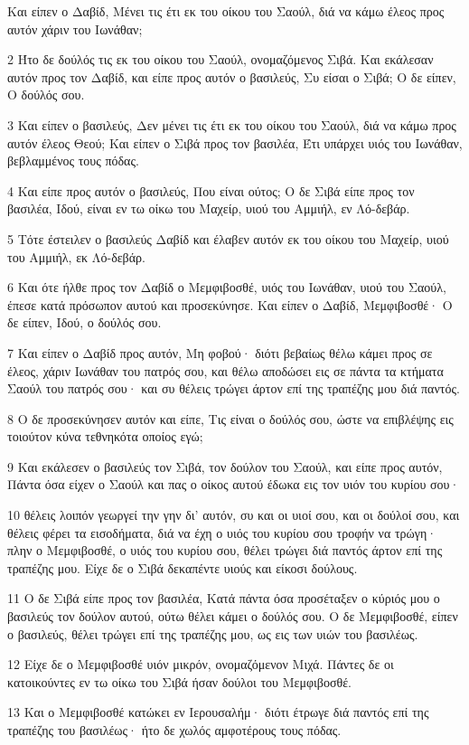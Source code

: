 \par Και είπεν ο Δαβίδ, Μένει τις έτι εκ του οίκου του Σαούλ, διά να κάμω έλεος προς αυτόν χάριν του Ιωνάθαν;
\par 2 Ήτο δε δούλός τις εκ του οίκου του Σαούλ, ονομαζόμενος Σιβά. Και εκάλεσαν αυτόν προς τον Δαβίδ, και είπε προς αυτόν ο βασιλεύς, Συ είσαι ο Σιβά; Ο δε είπεν, Ο δούλός σου.
\par 3 Και είπεν ο βασιλεύς, Δεν μένει τις έτι εκ του οίκου του Σαούλ, διά να κάμω προς αυτόν έλεος Θεού; Και είπεν ο Σιβά προς τον βασιλέα, Έτι υπάρχει υιός του Ιωνάθαν, βεβλαμμένος τους πόδας.
\par 4 Και είπε προς αυτόν ο βασιλεύς, Που είναι ούτος; Ο δε Σιβά είπε προς τον βασιλέα, Ιδού, είναι εν τω οίκω του Μαχείρ, υιού του Αμμιήλ, εν Λό-δεβάρ.
\par 5 Τότε έστειλεν ο βασιλεύς Δαβίδ και έλαβεν αυτόν εκ του οίκου του Μαχείρ, υιού του Αμμιήλ, εκ Λό-δεβάρ.
\par 6 Και ότε ήλθε προς τον Δαβίδ ο Μεμφιβοσθέ, υιός του Ιωνάθαν, υιού του Σαούλ, έπεσε κατά πρόσωπον αυτού και προσεκύνησε. Και είπεν ο Δαβίδ, Μεμφιβοσθέ· Ο δε είπεν, Ιδού, ο δούλός σου.
\par 7 Και είπεν ο Δαβίδ προς αυτόν, Μη φοβού· διότι βεβαίως θέλω κάμει προς σε έλεος, χάριν Ιωνάθαν του πατρός σου, και θέλω αποδώσει εις σε πάντα τα κτήματα Σαούλ του πατρός σου· και συ θέλεις τρώγει άρτον επί της τραπέζης μου διά παντός.
\par 8 Ο δε προσεκύνησεν αυτόν και είπε, Τις είναι ο δούλός σου, ώστε να επιβλέψης εις τοιούτον κύνα τεθνηκότα οποίος εγώ;
\par 9 Και εκάλεσεν ο βασιλεύς τον Σιβά, τον δούλον του Σαούλ, και είπε προς αυτόν, Πάντα όσα είχεν ο Σαούλ και πας ο οίκος αυτού έδωκα εις τον υιόν του κυρίου σου·
\par 10 θέλεις λοιπόν γεωργεί την γην δι' αυτόν, συ και οι υιοί σου, και οι δούλοί σου, και θέλεις φέρει τα εισοδήματα, διά να έχη ο υιός του κυρίου σου τροφήν να τρώγη· πλην ο Μεμφιβοσθέ, ο υιός του κυρίου σου, θέλει τρώγει διά παντός άρτον επί της τραπέζης μου. Είχε δε ο Σιβά δεκαπέντε υιούς και είκοσι δούλους.
\par 11 Ο δε Σιβά είπε προς τον βασιλέα, Κατά πάντα όσα προσέταξεν ο κύριός μου ο βασιλεύς τον δούλον αυτού, ούτω θέλει κάμει ο δούλός σου. Ο δε Μεμφιβοσθέ, είπεν ο βασιλεύς, θέλει τρώγει επί της τραπέζης μου, ως εις των υιών του βασιλέως.
\par 12 Είχε δε ο Μεμφιβοσθέ υιόν μικρόν, ονομαζόμενον Μιχά. Πάντες δε οι κατοικούντες εν τω οίκω του Σιβά ήσαν δούλοι του Μεμφιβοσθέ.
\par 13 Και ο Μεμφιβοσθέ κατώκει εν Ιερουσαλήμ· διότι έτρωγε διά παντός επί της τραπέζης του βασιλέως· ήτο δε χωλός αμφοτέρους τους πόδας.

